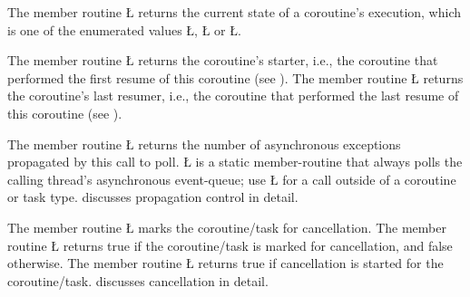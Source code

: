 \documentclass[openright,twoside]{report}
\begin{document}
The member routine \LGinlinetrue\LGbegin\lgrinde\L{}\endlgrinde\LGend{} returns the current state of a coroutine's execution, which is one of the enumerated values \LGinlinetrue\LGbegin\lgrinde\L{}\endlgrinde\LGend{}, \LGinlinetrue\LGbegin\lgrinde\L{}\endlgrinde\LGend{} or \LGinlinetrue\LGbegin\lgrinde\L{}\endlgrinde\LGend{}.

The member routine \LGinlinetrue\LGbegin\lgrinde\L{}\endlgrinde\LGend{} returns the coroutine's starter, i.e., the coroutine that performed the first resume of this coroutine (see ).
The member routine \LGinlinetrue\LGbegin\lgrinde\L{}\endlgrinde\LGend{} returns the coroutine's last resumer, i.e., the coroutine that performed the last resume of this coroutine (see ).

\begin{sloppypar}
The member routine \LGinlinetrue\LGbegin\lgrinde\L{}\endlgrinde\LGend{} returns the number of asynchronous exceptions propagated by this call to poll.
\LGinlinetrue\LGbegin\lgrinde\L{}\endlgrinde\LGend{} is a static member-routine that always polls the calling thread's asynchronous event-queue;
use \LGinlinetrue\LGbegin\lgrinde\L{}\endlgrinde\LGend{} for a call outside of a coroutine or task type.
 discusses propagation control in detail.
\end{sloppypar}

The member routine \LGinlinetrue\LGbegin\lgrinde\L{}\endlgrinde\LGend{} marks the coroutine/task for cancellation.
The member routine \LGinlinetrue\LGbegin\lgrinde\L{}\endlgrinde\LGend{} returns true if the coroutine/task is marked for cancellation, and false otherwise.
The member routine \LGinlinetrue\LGbegin\lgrinde\L{}\endlgrinde\LGend{} returns true if cancellation is started for the coroutine/task.
 discusses cancellation in detail.
\end{document}

